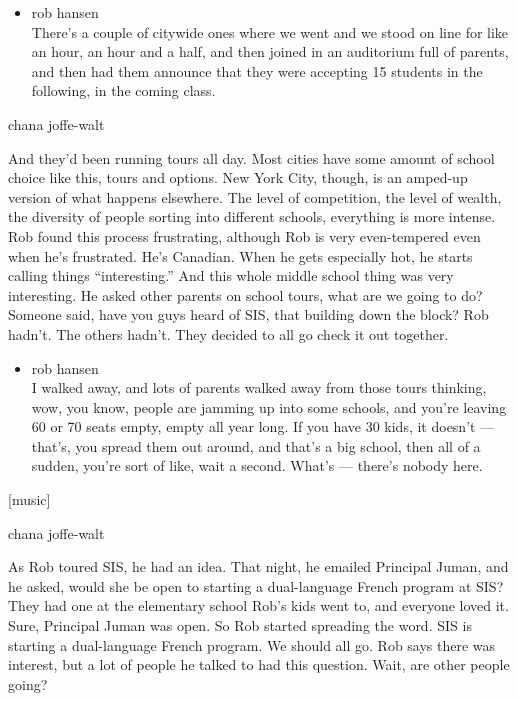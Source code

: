 \begin{itemize}
\tightlist
\item
  rob hansen\\
  There's a couple of citywide ones where we went and we stood on line
  for like an hour, an hour and a half, and then joined in an auditorium
  full of parents, and then had them announce that they were accepting
  15 students in the following, in the coming class.
\end{itemize}

chana joffe-walt

And they'd been running tours all day. Most cities have some amount of
school choice like this, tours and options. New York City, though, is an
amped-up version of what happens elsewhere. The level of competition,
the level of wealth, the diversity of people sorting into different
schools, everything is more intense. Rob found this process frustrating,
although Rob is very even-tempered even when he's frustrated. He's
Canadian. When he gets especially hot, he starts calling things
``interesting.'' And this whole middle school thing was very
interesting. He asked other parents on school tours, what are we going
to do? Someone said, have you guys heard of SIS, that building down the
block? Rob hadn't. The others hadn't. They decided to all go check it
out together.

\begin{itemize}
\tightlist
\item
  rob hansen\\
  I walked away, and lots of parents walked away from those tours
  thinking, wow, you know, people are jamming up into some schools, and
  you're leaving 60 or 70 seats empty, empty all year long. If you have
  30 kids, it doesn't --- that's, you spread them out around, and that's
  a big school, then all of a sudden, you're sort of like, wait a
  second. What's --- there's nobody here.
\end{itemize}

{[}music{]}

chana joffe-walt

As Rob toured SIS, he had an idea. That night, he emailed Principal
Juman, and he asked, would she be open to starting a dual-language
French program at SIS? They had one at the elementary school Rob's kids
went to, and everyone loved it. Sure, Principal Juman was open. So Rob
started spreading the word. SIS is starting a dual-language French
program. We should all go. Rob says there was interest, but a lot of
people he talked to had this question. Wait, are other people going?

